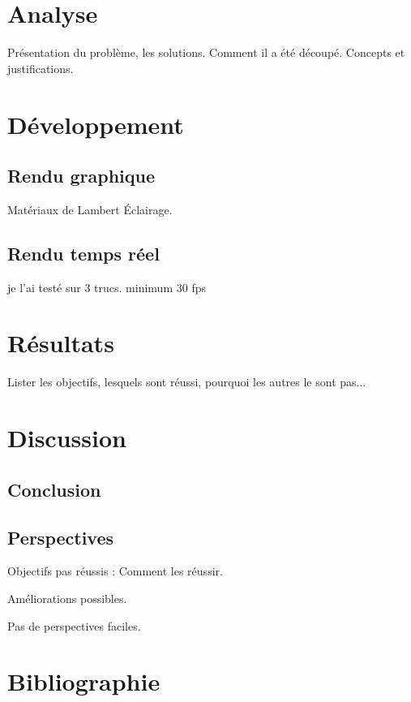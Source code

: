 \documentclass[a4paper,notitlepage]{report}
\begin{document}


\vspace*{\fill}

\vspace*{\fill}

\tableofcontents




\chapter{Analyse}
Présentation du problème, les solutions. Comment il a été découpé.
Concepts et justifications.



\chapter{Développement}

\section{Rendu graphique}
Matériaux de Lambert
Éclairage.






\section{Rendu temps réel}
je l'ai testé sur 3 trucs. minimum 30 fps

\chapter{Résultats}
Lister les objectifs, lesquels sont réussi, pourquoi les autres le sont pas...

\chapter{Discussion}
\section{Conclusion}
\section{Perspectives}
Objectifs pas réussis : Comment les réussir.

Améliorations possibles.

Pas de perspectives faciles.


\chapter{Bibliographie}
\end{document}
